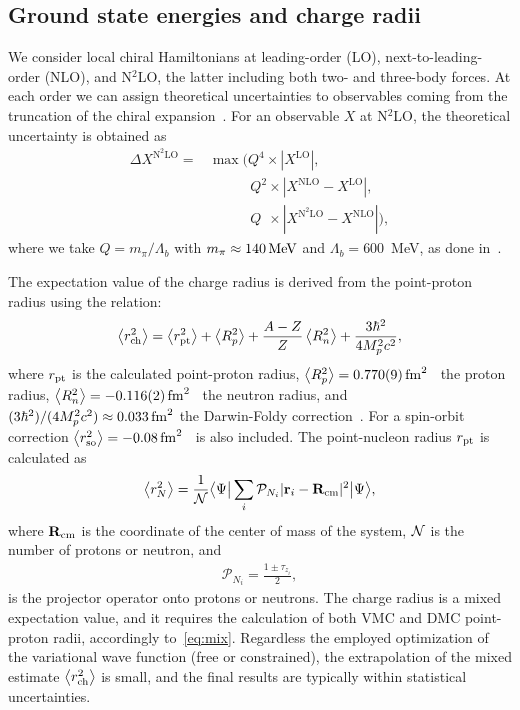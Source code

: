 \documentclass[aps,prc,twocolumn,superscriptaddress,floatfix]{revtex4-1}
\begin{document}
\subsection{Ground state energies and charge radii}
We consider local chiral Hamiltonians at leading-order (LO), 
next-to-leading-order (NLO), and N$^2$LO, the latter including both two- and three-body forces.
At each order we can assign theoretical uncertainties to observables coming from the 
truncation of the chiral expansion~\cite{Epelbaum:2015epja}. For an observable $X$ at N$^2$LO, 
the theoretical uncertainty is obtained as
\begin{align}
\Delta X^{\text{N}^2\text{LO}}=&\max(Q^4\times|X^{\text{LO}}|,\nonumber \\ 
&\phantom{\max(\,}Q^2\times|X^{\text{NLO}}-X^{\text{LO}}|, \nonumber \\
&\phantom{\max(\,}Q^{\phantom{2}}\times|X^{\text{N}^2\text{LO}}-X^{\text{NLO}}|),
\label{eq:err}
\end{align}
where we take $Q=m_\pi/\Lambda_b$ with $m_\pi\approx140\,\rm MeV$ and $\Lambda_b=600$~MeV, 
as done in~\cite{Lynn:2016,Lonardoni:2017afdmc}.

The expectation value of the charge radius is derived from the point-proton radius using the relation:
\begin{align}
	\left\langle r_{\rm ch}^2\right\rangle=
	\left\langle r_{\rm pt}^2\right\rangle+
	\left\langle R_p^2\right\rangle+
	\frac{A-Z}{Z}\left\langle R_n^2\right\rangle+
	\frac{3\hbar^2}{4M_p^2c^2},
	\label{eq:rch}
\end{align}
where $r_{\rm pt}$ is the calculated point-proton radius,
$\left\langle R_p^2\right\rangle=0.770(9)\,\rm{fm}^2$~\cite{Beringer:2012} the proton radius, 
$\left\langle R_n^2\right\rangle=-0.116(2)\,\rm{fm}^2$~\cite{Beringer:2012} the neutron radius,
and $(3\hbar^2)/(4M_p^2c^2)\approx0.033\,\rm{fm}^2$ the Darwin-Foldy correction~\cite{Friar:1997}.
For  a spin-orbit correction 
$\left\langle r_{\rm so}^2\right\rangle=-0.08\,\rm{fm}^2$~\cite{Ong:2010} is also included.
The point-nucleon radius $r_{\rm pt}$ is calculated as
\begin{align}
	\left\langle r_N^2\right\rangle=\frac{1}{{\cal N}}\big\langle\Psi\big|\sum_i\mathcal P_{N_i} |\vb{r}_i-\vb{R}_{\rm cm}|^2\big|\Psi\big\rangle,
\end{align}
where $\vb{R}_{\rm cm}$ is the coordinate of the center of mass of the system,
${\cal N}$ is the number of protons or neutron, and 
\begin{align}
	\mathcal P_{N_i}=\frac{1\pm\tau_{z_i}}{2},
	\label{eq:proj}
\end{align}
is the projector operator onto protons or neutrons. 
The charge radius is a mixed expectation value, and it requires the calculation of both
VMC and DMC point-proton radii, accordingly to~\cref{eq:mix}. 
Regardless the employed optimization of the variational wave function (free or constrained), 
the extrapolation of the mixed estimate $\left\langle r_{\rm ch}^2\right\rangle$ is small, 
and the final results are typically within statistical uncertainties.
\end{document}
